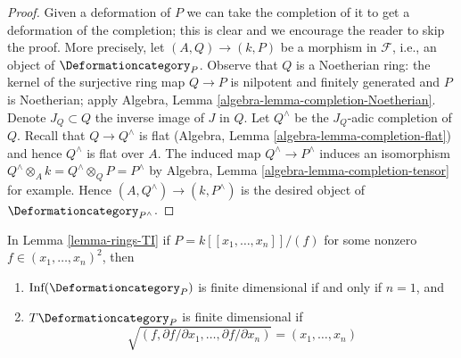 \begin{proof}
Given a deformation of $P$ we can take the completion
of it to get a deformation of the completion; this is
clear and we encourage the reader to skip the proof. More precisely,
let $(A, Q) \to (k, P)$ be a morphism in $\mathcal{F}$, i.e.,
an object of $\Deformationcategory_P$. Observe that $Q$ is a Noetherian
ring: the kernel of the surjective ring map $Q \to P$ is
nilpotent and finitely generated and $P$ is Noetherian; apply
Algebra, Lemma \ref{algebra-lemma-completion-Noetherian}.
Denote $J_Q \subset Q$ the inverse
image of $J$ in $Q$. Let $Q^\wedge$ be the $J_Q$-adic completion of $Q$.
Recall that $Q \to Q^\wedge$ is flat
(Algebra, Lemma \ref{algebra-lemma-completion-flat})
and hence $Q^\wedge$ is flat over $A$.
The induced map $Q^\wedge \to P^\wedge$ induces an isomorphism
$Q^\wedge \otimes_A k = Q^\wedge \otimes_Q P = P^\wedge$ by
Algebra, Lemma \ref{algebra-lemma-completion-tensor} for example.
Hence $(A, Q^\wedge) \to (k, P^\wedge)$
is the desired object of $\Deformationcategory_{P^\wedge}$.
\end{proof}

\begin{lemma}
\label{lemma-power-series-rings-TI}
In Lemma \ref{lemma-rings-TI} if $P = k[[x_1, \ldots, x_n]]/(f)$
for some nonzero $f \in (x_1, \ldots, x_n)^2$, then
\begin{enumerate}
\item $\text{Inf}(\Deformationcategory_P)$ is finite dimensional
if and only if $n = 1$, and
\item $T\Deformationcategory_P$ is finite dimensional if
$$
\sqrt{(f, \partial f/\partial x_1, \ldots,  \partial f/\partial x_n)} =
(x_1, \ldots, x_n)
$$
\end{enumerate}
\end{lemma}

